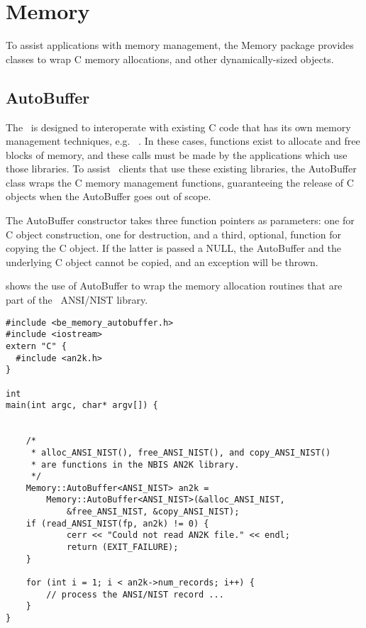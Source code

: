 %
%
\chapter{Memory}
\label{chp-memory}
To assist applications with memory management, the Memory package provides
classes to wrap C memory allocations, and other dynamically-sized objects.

\section{AutoBuffer}
\label{sec-autobuffer}
The \lname\ is designed to interoperate with existing C code that has its own
memory management techniques, e.g. \nbis~\cite{nbis}. In these cases, functions
exist to allocate and free blocks of memory, and these calls must be made by
the applications which use those libraries. To assist \sname\ clients that
use these existing libraries, the AutoBuffer class wraps the C memory
management functions, guaranteeing the release of C objects when the
AutoBuffer goes out of scope.

The AutoBuffer constructor takes three function pointers as parameters: one for
C object construction, one for destruction, and a third, optional, function
for copying the C object. If the latter is passed a NULL, the AutoBuffer and
the underlying C object cannot be copied, and an exception will be thrown.

 shows the use of AutoBuffer to wrap the memory
allocation routines that are part of the \nbis\ ANSI/NIST library.

\lstset{language=c++}
\begin{lstlisting}[caption={Using the AutoBuffer}, label=autobufferuse]
#include <be_memory_autobuffer.h>
#include <iostream>
extern "C" {
  #include <an2k.h>
}

int
main(int argc, char* argv[]) {


    /*
     * alloc_ANSI_NIST(), free_ANSI_NIST(), and copy_ANSI_NIST()
     * are functions in the NBIS AN2K library.
     */
    Memory::AutoBuffer<ANSI_NIST> an2k =
        Memory::AutoBuffer<ANSI_NIST>(&alloc_ANSI_NIST,
            &free_ANSI_NIST, &copy_ANSI_NIST);
    if (read_ANSI_NIST(fp, an2k) != 0) {
            cerr << "Could not read AN2K file." << endl;
            return (EXIT_FAILURE);
    }

    for (int i = 1; i < an2k->num_records; i++) {
        // process the ANSI/NIST record ...
    }
}

\end{lstlisting}

